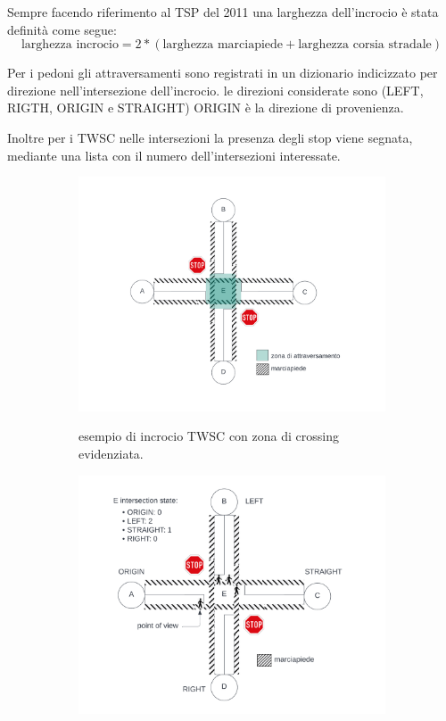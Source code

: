 Sempre facendo riferimento al TSP del 2011 una larghezza dell'incrocio è stata definità come segue:
\begin{equation}
  \text{larghezza incrocio} = 2 * (\text{larghezza marciapiede} + \text{larghezza corsia stradale})
\end{equation}

Per i pedoni gli attraversamenti sono registrati in un dizionario indicizzato per direzione nell'intersezione dell'incrocio.
le direzioni considerate sono (LEFT, RIGTH, ORIGIN e STRAIGHT) ORIGIN è la direzione di provenienza.

Inoltre per i TWSC nelle intersezioni la presenza degli stop viene segnata, mediante una lista con il numero dell'intersezioni interessate.

\begin{figure}
  \begin{subfigure}[b]{0.9\textwidth}
    \centering
    \includegraphics[width=\textwidth]{images/intersection state.png}
    \label{fig:intersection state}
    \caption{esempio di incrocio TWSC con zona di crossing evidenziata.}
  \end{subfigure}
  \hfill
  \centering
  \begin{subfigure}[b]{0.9\textwidth}
    \centering
    \includegraphics[width=\textwidth]{images/crosswalks.png}

\end{subfigure}
\end{figure}
